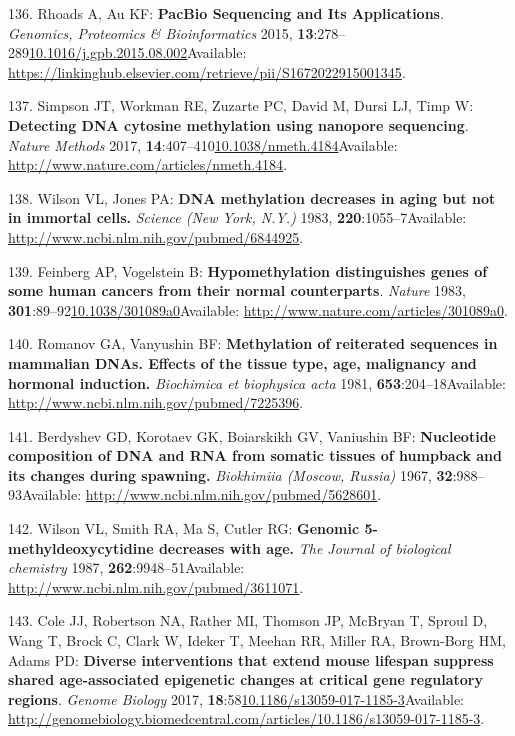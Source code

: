 \documentclass[
]{book}
\begin{document}
\leavevmode\hypertarget{ref-Rhoads2015}{}%
136. Rhoads A, Au KF: \textbf{PacBio Sequencing and Its Applications}. \emph{Genomics, Proteomics \& Bioinformatics} 2015, \textbf{13}:278--289\href{https://doi.org/10.1016/j.gpb.2015.08.002}{10.1016/j.gpb.2015.08.002}Available: \url{https://linkinghub.elsevier.com/retrieve/pii/S1672022915001345}.

\leavevmode\hypertarget{ref-Simpson2017}{}%
137. Simpson JT, Workman RE, Zuzarte PC, David M, Dursi LJ, Timp W: \textbf{Detecting DNA cytosine methylation using nanopore sequencing}. \emph{Nature Methods} 2017, \textbf{14}:407--410\href{https://doi.org/10.1038/nmeth.4184}{10.1038/nmeth.4184}Available: \url{http://www.nature.com/articles/nmeth.4184}.

\leavevmode\hypertarget{ref-Wilson1983}{}%
138. Wilson VL, Jones PA: \textbf{DNA methylation decreases in aging but not in immortal cells.} \emph{Science (New York, N.Y.)} 1983, \textbf{220}:1055--7Available: \url{http://www.ncbi.nlm.nih.gov/pubmed/6844925}.

\leavevmode\hypertarget{ref-Feinberg1983}{}%
139. Feinberg AP, Vogelstein B: \textbf{Hypomethylation distinguishes genes of some human cancers from their normal counterparts}. \emph{Nature} 1983, \textbf{301}:89--92\href{https://doi.org/10.1038/301089a0}{10.1038/301089a0}Available: \url{http://www.nature.com/articles/301089a0}.

\leavevmode\hypertarget{ref-Romanov1981}{}%
140. Romanov GA, Vanyushin BF: \textbf{Methylation of reiterated sequences in mammalian DNAs. Effects of the tissue type, age, malignancy and hormonal induction.} \emph{Biochimica et biophysica acta} 1981, \textbf{653}:204--18Available: \url{http://www.ncbi.nlm.nih.gov/pubmed/7225396}.

\leavevmode\hypertarget{ref-Berdyshev1967}{}%
141. Berdyshev GD, Korotaev GK, Boiarskikh GV, Vaniushin BF: \textbf{Nucleotide composition of DNA and RNA from somatic tissues of humpback and its changes during spawning.} \emph{Biokhimiia (Moscow, Russia)} 1967, \textbf{32}:988--93Available: \url{http://www.ncbi.nlm.nih.gov/pubmed/5628601}.

\leavevmode\hypertarget{ref-Wilson1987}{}%
142. Wilson VL, Smith RA, Ma S, Cutler RG: \textbf{Genomic 5-methyldeoxycytidine decreases with age.} \emph{The Journal of biological chemistry} 1987, \textbf{262}:9948--51Available: \url{http://www.ncbi.nlm.nih.gov/pubmed/3611071}.

\leavevmode\hypertarget{ref-Cole2017}{}%
143. Cole JJ, Robertson NA, Rather MI, Thomson JP, McBryan T, Sproul D, Wang T, Brock C, Clark W, Ideker T, Meehan RR, Miller RA, Brown-Borg HM, Adams PD: \textbf{Diverse interventions that extend mouse lifespan suppress shared age-associated epigenetic changes at critical gene regulatory regions}. \emph{Genome Biology} 2017, \textbf{18}:58\href{https://doi.org/10.1186/s13059-017-1185-3}{10.1186/s13059-017-1185-3}Available: \url{http://genomebiology.biomedcentral.com/articles/10.1186/s13059-017-1185-3}.
\end{document}
